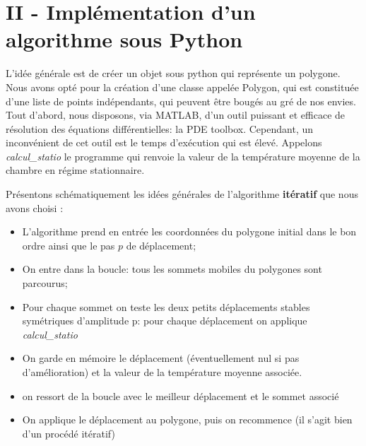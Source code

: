 \documentclass[a4paper,reqno]{article}
\newcommand{\pa}{\hspace{0.5cm}}
\begin{document}
\newpage

\section*{II - Implémentation d'un algorithme sous Python} 
\pa L'idée générale est de créer un objet sous python qui représente un polygone. Nous avons opté pour la création d'une classe appelée Polygon, qui est constituée d'une liste de points indépendants, qui peuvent être bougés au gré de nos envies. 
\\
Tout d'abord, nous disposons, via MATLAB, d'un outil puissant et efficace de résolution des équations différentielles: la PDE toolbox. Cependant, un inconvénient de cet outil est le temps d'exécution qui est élevé. Appelons \textit{calcul\_statio} le programme qui renvoie la valeur de la température moyenne de la chambre en régime stationnaire.

\par Présentons schématiquement les idées générales de l'algorithme \textbf{itératif} que nous avons choisi : \vspace{0.3cm}

\begin{itemize}
	\item L'algorithme prend en entrée les coordonnées du polygone initial dans le bon ordre ainsi que le pas $p$ de déplacement;
	\item On entre dans la boucle: tous les sommets mobiles du polygones sont parcourus;
	\item Pour chaque sommet on teste les deux petits déplacements stables symétriques d'amplitude p: pour chaque déplacement on applique \textit{calcul\_statio}
	\item On garde en mémoire le déplacement (éventuellement nul si pas d'amélioration) et la valeur de la température moyenne associée. 
	\item on ressort de la boucle avec le meilleur déplacement et le sommet associé
	\item On applique le déplacement au polygone, puis on recommence (il s'agit bien d'un procédé itératif)
\end{itemize}
\vspace{0.3cm}


\par 
\end{document}
